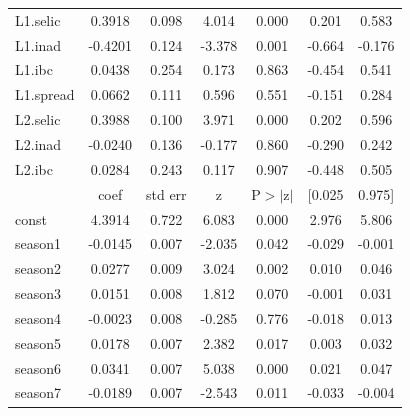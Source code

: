 \documentclass[a4paper,
               article,
               12pt,
               openany,
               oneside,
               english,
               brazil]{abntex2}
\numberwithin{equation}{section}
\begin{document}
\begin{longtable}{lcccccc}
    L1.selic  &       0.3918  &        0.098     &     4.014  &         0.000        &        0.201    &        0.583     \\
    L1.inad   &      -0.4201  &        0.124     &    -3.378  &         0.001        &       -0.664    &       -0.176     \\
    L1.ibc    &       0.0438  &        0.254     &     0.173  &         0.863        &       -0.454    &        0.541     \\
    L1.spread &       0.0662  &        0.111     &     0.596  &         0.551        &       -0.151    &        0.284     \\
    L2.selic  &       0.3988  &        0.100     &     3.971  &         0.000        &        0.202    &        0.596     \\
    L2.inad   &      -0.0240  &        0.136     &    -0.177  &         0.860        &       -0.290    &        0.242     \\
    L2.ibc    &       0.0284  &        0.243     &     0.117  &         0.907        &       -0.448    &        0.505     \\
    \toprule
    & coef & std err & z & P$> |$z$|$ & [0.025 & 0.975]  \\
    \midrule
    const     &       4.3914  &        0.722     &     6.083  &         0.000        &        2.976    &        5.806     \\
    season1   &      -0.0145  &        0.007     &    -2.035  &         0.042        &       -0.029    &       -0.001     \\
    season2   &       0.0277  &        0.009     &     3.024  &         0.002        &        0.010    &        0.046     \\
    season3   &       0.0151  &        0.008     &     1.812  &         0.070        &       -0.001    &        0.031     \\
    season4   &      -0.0023  &        0.008     &    -0.285  &         0.776        &       -0.018    &        0.013     \\
    season5   &       0.0178  &        0.007     &     2.382  &         0.017        &        0.003    &        0.032     \\
    season6   &       0.0341  &        0.007     &     5.038  &         0.000        &        0.021    &        0.047     \\
    season7   &      -0.0189  &        0.007     &    -2.543  &         0.011        &       -0.033    &       -0.004     \\

\end{longtable}
\end{document}
